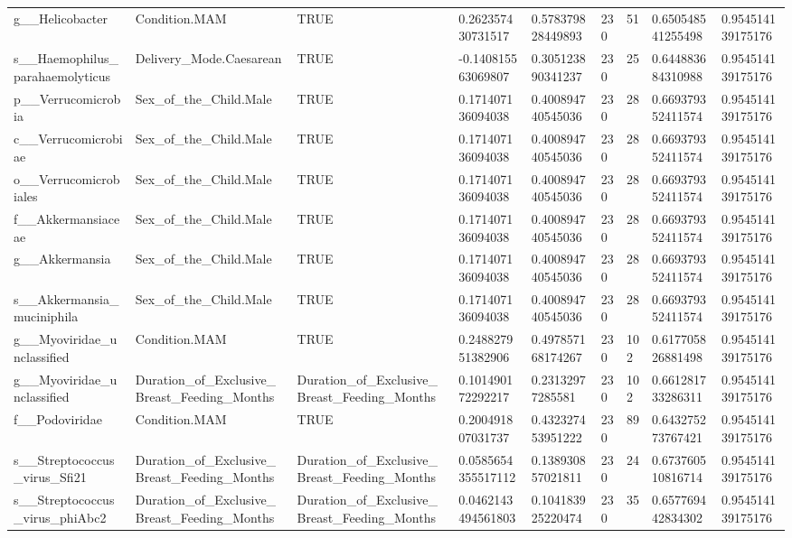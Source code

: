 \begin{longtable}{lllllllll}
g\_\_Helicobacter & Condition.MAM & TRUE & 0.262357430731517 & 0.578379828449893 & 230 & 51 & 0.650548541255498 & 0.954514139175176 \\
s\_\_Haemophilus\_parahaemolyticus & Delivery\_Mode.Caesarean & TRUE & -0.140815563069807 & 0.305123890341237 & 230 & 25 & 0.644883684310988 & 0.954514139175176 \\
p\_\_Verrucomicrobia & Sex\_of\_the\_Child.Male & TRUE & 0.171407136094038 & 0.400894740545036 & 230 & 28 & 0.669379352411574 & 0.954514139175176 \\
c\_\_Verrucomicrobiae & Sex\_of\_the\_Child.Male & TRUE & 0.171407136094038 & 0.400894740545036 & 230 & 28 & 0.669379352411574 & 0.954514139175176 \\
o\_\_Verrucomicrobiales & Sex\_of\_the\_Child.Male & TRUE & 0.171407136094038 & 0.400894740545036 & 230 & 28 & 0.669379352411574 & 0.954514139175176 \\
f\_\_Akkermansiaceae & Sex\_of\_the\_Child.Male & TRUE & 0.171407136094038 & 0.400894740545036 & 230 & 28 & 0.669379352411574 & 0.954514139175176 \\
g\_\_Akkermansia & Sex\_of\_the\_Child.Male & TRUE & 0.171407136094038 & 0.400894740545036 & 230 & 28 & 0.669379352411574 & 0.954514139175176 \\
s\_\_Akkermansia\_muciniphila & Sex\_of\_the\_Child.Male & TRUE & 0.171407136094038 & 0.400894740545036 & 230 & 28 & 0.669379352411574 & 0.954514139175176 \\
g\_\_Myoviridae\_unclassified & Condition.MAM & TRUE & 0.248827951382906 & 0.497857168174267 & 230 & 102 & 0.617705826881498 & 0.954514139175176 \\
g\_\_Myoviridae\_unclassified & Duration\_of\_Exclusive\_Breast\_Feeding\_Months & Duration\_of\_Exclusive\_Breast\_Feeding\_Months & 0.101490172292217 & 0.23132977285581 & 230 & 102 & 0.661281733286311 & 0.954514139175176 \\
f\_\_Podoviridae & Condition.MAM & TRUE & 0.200491807031737 & 0.432327453951222 & 230 & 89 & 0.643275273767421 & 0.954514139175176 \\
s\_\_Streptococcus\_virus\_Sfi21 & Duration\_of\_Exclusive\_Breast\_Feeding\_Months & Duration\_of\_Exclusive\_Breast\_Feeding\_Months & 0.0585654355517112 & 0.138930857021811 & 230 & 24 & 0.673760510816714 & 0.954514139175176 \\
s\_\_Streptococcus\_virus\_phiAbc2 & Duration\_of\_Exclusive\_Breast\_Feeding\_Months & Duration\_of\_Exclusive\_Breast\_Feeding\_Months & 0.0462143494561803 & 0.104183925220474 & 230 & 35 & 0.657769442834302 & 0.954514139175176 \\

\end{longtable}
